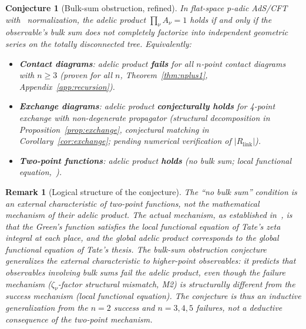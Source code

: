 \documentclass[11pt,a4paper]{article}
\newtheorem{conjecture}{Conjecture}
\newtheorem{remark}{Remark}
\begin{document}
\begin{conjecture}[Bulk-sum obstruction, refined]
\label{conj:bulk-sum}
In flat-space p-adic AdS/CFT with~\cite{HJ24} normalization, the adelic product $\prod_\nu A_\nu = 1$ holds if and only if the observable's bulk sum does not \emph{completely factorize} into independent geometric series on the totally disconnected tree. Equivalently:
\begin{itemize}[leftmargin=2em]
    \item \textbf{Contact diagrams}: adelic product \textbf{fails} for all $n$-point contact diagrams with $n \geq 3$ (proven for all $n$, Theorem~\ref{thm:nplus1}, Appendix~\ref{app:recursion}).
    \item \textbf{Exchange diagrams}: adelic product \textbf{conjecturally holds} for 4-point exchange with non-degenerate propagator (structural decomposition in Proposition~\ref{prop:exchange}, conjectural matching in Corollary~\ref{cor:exchange}; pending numerical verification of $|R_{\mathrm{link}}|$).
    \item \textbf{Two-point functions}: adelic product \textbf{holds} (no bulk sum; local functional equation,~\cite{HSYZ20}).
\end{itemize}
\end{conjecture}

\begin{remark}[Logical structure of the conjecture]
\label{rem:logical}
The ``no bulk sum'' condition is an \emph{external characteristic} of two-point functions, not the mathematical mechanism of their adelic product. The actual mechanism, as established in~\cite{HSYZ20}, is that the Green's function satisfies the local functional equation of Tate's zeta integral at each place, and the global adelic product corresponds to the global functional equation of Tate's thesis. The bulk-sum obstruction conjecture generalizes the external characteristic to higher-point observables: it predicts that observables involving bulk sums fail the adelic product, even though the failure mechanism ($\zeta_\nu$-factor structural mismatch, M2) is structurally different from the success mechanism (local functional equation). The conjecture is thus an \emph{inductive generalization} from the $n=2$ success and $n=3,4,5$ failures, not a deductive consequence of the two-point mechanism.
\end{remark}
\end{document}
